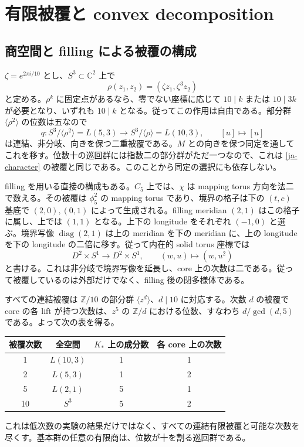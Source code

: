 \documentclass[12pt]{amsart}
\theoremstyle{definition}
\theoremstyle{remark}
\numberwithin{equation}{section}
\newcommand{\Z}{\mathbb{Z}}
\newcommand{\C}{\mathbb{C}}
\theoremstyle{definition}
\begin{document}
\section{有限被覆と convex decomposition}\label{ja-covers}
\subsection{商空間と filling による被覆の構成}
$\zeta=e^{2\pi i/10}$ とし、$S^3\subset\C^2$ 上で
\[
\rho(z_1,z_2)=(\zeta z_1,\zeta^3z_2)
\]
と定める。$\rho^k$ に固定点があるなら、零でない座標に応じて $10\mid k$ または $10\mid3k$ が必要となり、いずれも $10\mid k$ となる。従ってこの作用は自由である。部分群 $\langle\rho^2\rangle$ の位数は五なので
\begin{equation}\label{ja-covermap}
q:S^3/\langle\rho^2\rangle=L(5,3)\longrightarrow
S^3/\langle\rho\rangle=L(10,3),\qquad[u]\longmapsto[u]
\end{equation}
は連結、非分岐、向きを保つ二重被覆である。$M$ との向きを保つ同定を通してこれを移す。位数十の巡回群には指数二の部分群がただ一つなので、これは \eqref{ja-character} の被覆と同じである。このことから同定の選択にも依存しない。

filling を用いる直接の構成もある。$C_5$ 上では、$\chi$ は mapping torus 方向を法二で数える。その被覆は $\phi_5^2$ の mapping torus であり、境界の格子は下の $(t,c)$ 基底で $(2,0),(0,1)$ によって生成される。filling meridian $(2,1)$ はこの格子に属し、上では $(1,1)$ となる。上下の longitude をそれぞれ $(-1,0)$ と選ぶ。境界写像 $\operatorname{diag}(2,1)$ は上の meridian を下の meridian に、上の longitude を下の longitude の二倍に移す。従って内在的 solid torus 座標では
\[
D^2\times S^1\longrightarrow D^2\times S^1,\qquad(w,u)\longmapsto(w,u^2)
\]
と書ける。これは非分岐で境界写像を延長し、core 上の次数は二である。従って被覆しているのは外部だけでなく、filling 後の閉多様体である。

すべての連結被覆は $\Z/10$ の部分群 $\langle z^d\rangle$、$d\mid10$ に対応する。次数 $d$ の被覆で core の各 lift が持つ次数は、$z^5$ の $\Z/d$ における位数、すなわち $d/\gcd(d,5)$ である。よって次の表を得る。
\begin{center}
\begin{tabular}{cccc}\toprule
被覆次数 & 全空間 & $K_*$ 上の成分数 & 各 core 上の次数\\\midrule
1 & $L(10,3)$ & 1 & 1\\
2 & $L(5,3)$ & 1 & 2\\
5 & $L(2,1)$ & 5 & 1\\
10 & $S^3$ & 5 & 2\\\bottomrule
\end{tabular}
\end{center}
これは低次数の実験の結果だけではなく、すべての連結有限被覆と可能な次数を尽くす。基本群の任意の有限商は、位数が十を割る巡回群である。
\end{document}
